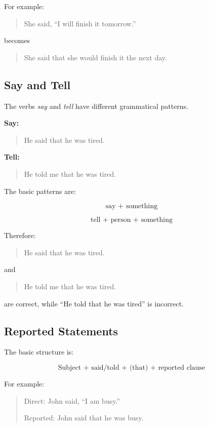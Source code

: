 For example:

\begin{quotation}
She said, ``I will finish it tomorrow.''
\end{quotation}

becomes

\begin{quotation}
She said that she would finish it the next day.
\end{quotation}


\subsection{Say and Tell}

The verbs \textit{say} and \textit{tell} have different grammatical patterns.

\textbf{Say:}

\begin{quotation}
He said that he was tired.
\end{quotation}

\textbf{Tell:}

\begin{quotation}
He told me that he was tired.
\end{quotation}

The basic patterns are:

\[
\text{say + something}
\]

\[
\text{tell + person + something}
\]

Therefore:

\begin{quotation}
He said that he was tired.
\end{quotation}

and

\begin{quotation}
He told me that he was tired.
\end{quotation}

are correct, while ``He told that he was tired'' is incorrect.


\subsection{Reported Statements}

The basic structure is:

\[
\text{Subject + said/told + (that) + reported clause}
\]

For example:

\begin{quotation}
Direct: John said, ``I am busy.''

Reported: John said that he was busy.
\end{quotation}

